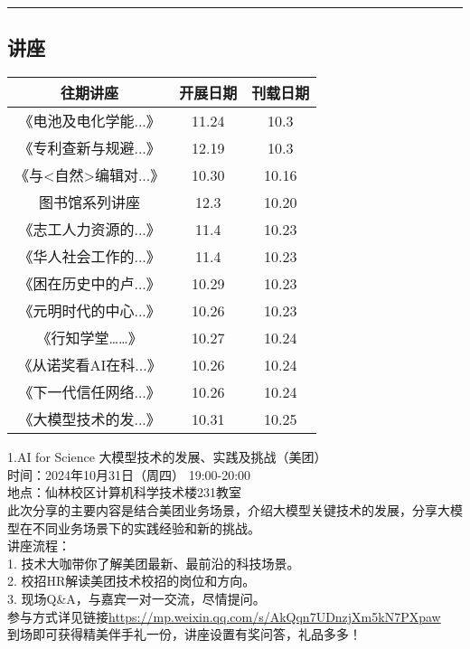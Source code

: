 \documentclass[letterpaper, 12pt]{article}
\begin{document}
\hrule
\pagebreak
\begin{multicols}{2}

\section{讲座}
\begin{tabular}{|c|c|c|}
    \hline
    往期讲座 & 开展日期 & 刊载日期\\
    \hline\hline
    《电池及电化学能...》 & 11.24 & 10.3\\
    《专利查新与规避...》 & 12.19 & 10.3\\
    《与<自然>编辑对...》 & 10.30 & 10.16\\
    图书馆系列讲座 & 12.3 & 10.20\\
    《志工人力资源的...》 & 11.4 & 10.23\\
    《华人社会工作的...》 & 11.4 & 10.23\\
    《困在历史中的卢...》 & 10.29 & 10.23\\
    《元明时代的中心...》 & 10.26 & 10.23\\
    《行知学堂……》 & 10.27 & 10.24\\
    《从诺奖看AI在科...》 & 10.26 & 10.24\\
    《下一代信任网络...》 & 10.26 & 10.24\\
    《大模型技术的发...》 & 10.31 & 10.25\\
    \hline
\end{tabular}

1.AI for Science 大模型技术的发展、实践及挑战（美团）\\
时间：2024年10月31日（周四） 19:00-20:00\\
地点：仙林校区计算机科学技术楼231教室\\
此次分享的主要内容是结合美团业务场景，介绍大模型关键技术的发展，分享大模型在不同业务场景下的实践经验和新的挑战。\\
讲座流程：\\
1. 技术大咖带你了解美团最新、最前沿的科技场景。\\
2. 校招HR解读美团技术校招的岗位和方向。\\
3. 现场Q\&A，与嘉宾一对一交流，尽情提问。\\
参与方式详见链接\url{https://mp.weixin.qq.com/s/AkQqn7UDnzjXm5kN7PXpaw}\\
到场即可获得精美伴手礼一份，讲座设置有奖问答，礼品多多！\\


\end{multicols}
\end{document}
